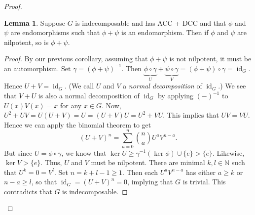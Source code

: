 \documentclass[10pt,letterpaper,cm]{nupset}
\theoremstyle{definition}
\newtheorem{lemma}{Lemma}
\newcommand{\N}{\mathbb N}
\newcommand{\1}{\mathbf{1}}
\newcommand{\0}{\vec 0}
\DeclareMathOperator{\id}{id}
\begin{document}
\begin{proof}
\begin{lemma}
Suppose $G$ is indecomposable and has ACC + DCC and that $\phi$ and $\psi$ are endomorphisms such that $\phi + \psi$ is an endomorphism. Then if $\phi$ and $\psi$ are nilpotent, so is $\phi + \psi$.
\end{lemma}
\begin{proof}
By our previous corollary, assuming that $\phi + \psi$ is not nilpotent, it must be an automorphism. Set $\gamma = (\phi + \psi)^{-1}$. Then $\underbrace{\phi \circ \gamma}_U + \underbrace{\psi \circ \gamma}_V = (\phi +\psi) \circ \gamma = \id_G$. Hence $U + V = \id_G$. (We call $U$ and $V$ a \textit{normal decomposition} of $\id_G$.) We see that $V + U$ is also a normal decomposition of $\id_G$ by applying $(-)^{-1}$ to $U(x)V(x) =x$ for any $x \in G$.
Now, $U^2 + UV = U(U + V) = U = (U + V)U = U^2 + VU$. This implies that $UV = VU$. Hence we can apply the binomial theorem to get $$(U + V)^n = \sum_{a=0}^n{ {n}\choose {a}} U^aV^{n-a}.$$ But since $U = \phi \circ \gamma$, we know that $\ker U\geq \gamma^{-1}(\ker \phi) \cup \{e\} > \{e\}$. Likewise, $\ker V > \{e\}$. Thus, $U$ and $V$ must be nilpotent. There are minimal $k, l \in \N$ such that $U^k = 0 = V^l$. Set $n = k+l -1 \geq 1$. Then each $U^aV^{n-a}$ has either $a\geq k$ or $n-a\geq l$, so that $\id_G = (U+V)^n = 0$, implying that $G$ is trivial. This contradicts that $G$ is indecomposable.
\end{proof}


\end{proof}
\end{document}
